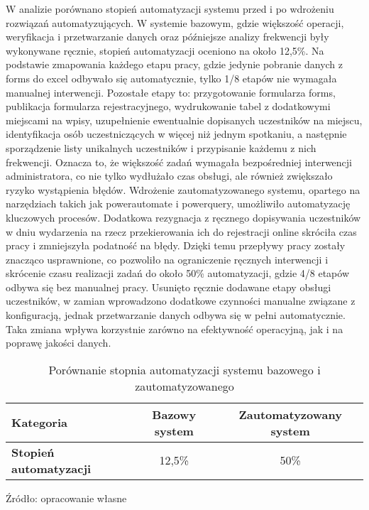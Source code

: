 W analizie porównano stopień automatyzacji systemu przed i po wdrożeniu rozwiązań automatyzujących. W systemie bazowym, gdzie większość operacji, weryfikacja i przetwarzanie danych oraz późniejsze analizy frekwencji były wykonywane ręcznie, stopień automatyzacji oceniono na około 12,5\%. Na podstawie zmapowania każdego etapu pracy, gdzie jedynie pobranie danych z \gls{forms} do \gls{excel} odbywało się automatycznie, tylko 1/8 etapów nie wymagała manualnej interwencji. Pozostałe etapy to: przygotowanie formularza \gls{forms}, publikacja formularza rejestracyjnego, wydrukowanie tabel z dodatkowymi miejscami na wpisy, uzupełnienie ewentualnie dopisanych uczestników na miejscu, identyfikacja osób uczestniczących w więcej niż jednym spotkaniu, a następnie sporządzenie listy unikalnych uczestników i przypisanie każdemu z nich frekwencji. Oznacza to, że większość zadań wymagała bezpośredniej interwencji administratora, co nie tylko wydłużało czas obsługi, ale również zwiększało ryzyko wystąpienia błędów. 
Wdrożenie zautomatyzowanego systemu, opartego na narzędziach takich jak \gls{powerautomate} i \gls{powerquery}, umożliwiło automatyzację kluczowych procesów. Dodatkowa rezygnacja z ręcznego dopisywania uczestników w dniu wydarzenia na rzecz przekierowania ich do rejestracji online skróciła czas pracy i zmniejszyła podatność na błędy. Dzięki temu przepływy pracy zostały znacząco usprawnione, co pozwoliło na ograniczenie ręcznych interwencji i skrócenie czasu realizacji zadań do około 50\% automatyzacji, gdzie 4/8 etapów odbywa się bez manualnej pracy. Usunięto ręcznie dodawane etapy obsługi uczestników, w zamian wprowadzono dodatkowe czynności manualne związane z konfiguracją, jednak przetwarzanie danych odbywa się w pełni automatycznie. Taka zmiana wpływa korzystnie zarówno na efektywność operacyjną, jak i na poprawę jakości danych.

\begin{table}[ht]
    \centering
    \caption[Porównanie stopnia automatyzacji systemu bazowego i zautomatyzowanego, źródło: opracowanie własne]{Porównanie stopnia automatyzacji systemu bazowego i zautomatyzowanego}
    \renewcommand{\arraystretch}{1.3} %
    \begin{tabular}{| l | c | c |}
        \hline
        \textbf{Kategoria} & \textbf{Bazowy system} & \textbf{Zautomatyzowany system} \\
        \hline
        \textbf{Stopień automatyzacji} & 12,5\% & 50\% \\
        \hline
    \end{tabular}
    \vspace{0.5em}
    \par\raggedright\footnotesize{Źródło: opracowanie własne}
\end{table}

